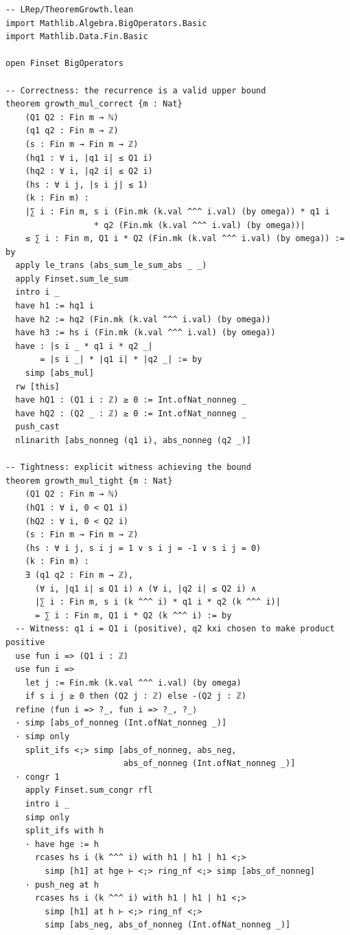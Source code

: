 \documentclass[11pt,a4paper]{article}
\theoremstyle{definition}
\theoremstyle{plain}
\theoremstyle{remark}
\begin{document}
\begin{leanblock}
\begin{lstlisting}[language={}]
-- LRep/TheoremGrowth.lean
import Mathlib.Algebra.BigOperators.Basic
import Mathlib.Data.Fin.Basic

open Finset BigOperators

-- Correctness: the recurrence is a valid upper bound
theorem growth_mul_correct {m : Nat}
    (Q1 Q2 : Fin m → ℕ)
    (q1 q2 : Fin m → ℤ)
    (s : Fin m → Fin m → ℤ)
    (hq1 : ∀ i, |q1 i| ≤ Q1 i)
    (hq2 : ∀ i, |q2 i| ≤ Q2 i)
    (hs : ∀ i j, |s i j| ≤ 1)
    (k : Fin m) :
    |∑ i : Fin m, s i (Fin.mk (k.val ^^^ i.val) (by omega)) * q1 i
                  * q2 (Fin.mk (k.val ^^^ i.val) (by omega))|
    ≤ ∑ i : Fin m, Q1 i * Q2 (Fin.mk (k.val ^^^ i.val) (by omega)) := by
  apply le_trans (abs_sum_le_sum_abs _ _)
  apply Finset.sum_le_sum
  intro i _
  have h1 := hq1 i
  have h2 := hq2 (Fin.mk (k.val ^^^ i.val) (by omega))
  have h3 := hs i (Fin.mk (k.val ^^^ i.val) (by omega))
  have : |s i _ * q1 i * q2 _|
       = |s i _| * |q1 i| * |q2 _| := by
    simp [abs_mul]
  rw [this]
  have hQ1 : (Q1 i : ℤ) ≥ 0 := Int.ofNat_nonneg _
  have hQ2 : (Q2 _ : ℤ) ≥ 0 := Int.ofNat_nonneg _
  push_cast
  nlinarith [abs_nonneg (q1 i), abs_nonneg (q2 _)]

-- Tightness: explicit witness achieving the bound
theorem growth_mul_tight {m : Nat}
    (Q1 Q2 : Fin m → ℕ)
    (hQ1 : ∀ i, 0 < Q1 i)
    (hQ2 : ∀ i, 0 < Q2 i)
    (s : Fin m → Fin m → ℤ)
    (hs : ∀ i j, s i j = 1 ∨ s i j = -1 ∨ s i j = 0)
    (k : Fin m) :
    ∃ (q1 q2 : Fin m → ℤ),
      (∀ i, |q1 i| ≤ Q1 i) ∧ (∀ i, |q2 i| ≤ Q2 i) ∧
      |∑ i : Fin m, s i (k ^^^ i) * q1 i * q2 (k ^^^ i)|
      = ∑ i : Fin m, Q1 i * Q2 (k ^^^ i) := by
  -- Witness: q1 i = Q1 i (positive), q2 kxi chosen to make product positive
  use fun i => (Q1 i : ℤ)
  use fun i =>
    let j := Fin.mk (k.val ^^^ i.val) (by omega)
    if s i j ≥ 0 then (Q2 j : ℤ) else -(Q2 j : ℤ)
  refine ⟨fun i => ?_, fun i => ?_, ?_⟩
  · simp [abs_of_nonneg (Int.ofNat_nonneg _)]
  · simp only
    split_ifs <;> simp [abs_of_nonneg, abs_neg,
                        abs_of_nonneg (Int.ofNat_nonneg _)]
  · congr 1
    apply Finset.sum_congr rfl
    intro i _
    simp only
    split_ifs with h
    · have hge := h
      rcases hs i (k ^^^ i) with h1 | h1 | h1 <;>
        simp [h1] at hge ⊢ <;> ring_nf <;> simp [abs_of_nonneg]
    · push_neg at h
      rcases hs i (k ^^^ i) with h1 | h1 | h1 <;>
        simp [h1] at h ⊢ <;> ring_nf <;>
        simp [abs_neg, abs_of_nonneg (Int.ofNat_nonneg _)]
\end{lstlisting}
\end{leanblock}
\end{document}
